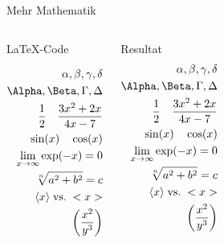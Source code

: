 \begin{frame}[fragile]{Mehr Mathematik}
  \begin{columns}[T]
    \begin{block}{\LaTeX-Code}
      \begin{lstverbatim}
      \begin{align*}
        \alpha, \beta, \gamma, \delta \\ 
        \Alpha, \Beta, \Gamma, \Delta \\
        \frac12 \quad \frac{3x^2 + 2x}{4x - 7} \\
        \sin(x) \quad \cos(x) \\
        \lim_{x \to \infty} \exp(-x) = 0 \\
        \sqrt[n]{a^2 + b^2} = c \\
        \langle x \rangle \; \text{vs.} \; < x >  \\
        \left(\frac{x^2}{y^3}\right)
      \end{align*}
      \end{lstverbatim}
    \end{block}
    \begin{block}{Resultat}
      \begin{align*}
        \alpha, \beta, \gamma, \delta \\ 
        \Alpha, \Beta, \Gamma, \Delta \\
        \frac12 \quad \frac{3x^2 + 2x}{4x - 7} \\
        \sin(x) \quad \cos(x) \\
        \lim_{x \to \infty} \exp(-x) = 0 \\
        \sqrt[n]{a^2 + b^2} = c \\
        \langle x \rangle \; \text{vs.} \; < x >  \\
        \left(\frac{x^2}{y^3}\right)
      \end{align*}
    \end{block}
  \end{columns}
\end{frame}


